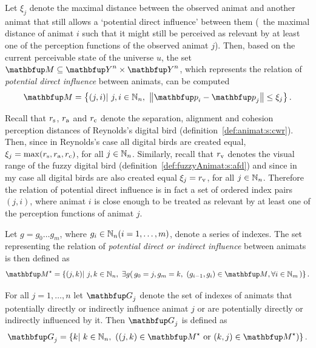 Let $\xi_j$ denote the maximal distance between the observed animat and another animat that still allows a `potential direct influence' between them (\ie\ the maximal distance of animat $i$ such that it might still be perceived as relevant by at least one of the perception functions of the observed animat $j$). Then, based on the current perceivable state of the universe $u$, the set $\set{M} \subseteq \set{Y}^n \times \set{Y}^n$, which represents the relation of \emph{potential direct influence} between animats, can be computed
%
\begin{equation}
\set{M}=\left\{ (j,i)|\ j, i \in \N_n,\ \left\|\vect{p}_i-\vect{p}_j\right\| \leq \xi_j \right\}. \label{eq:metric:M}
\end{equation}

Recall that $r_\textnormal{s}$, $r_\textnormal{a}$ and $r_\textnormal{c}$ denote the separation, alignment and cohesion perception distances of Reynolds's digital bird (definition~\ref{def:animat:s:cwr}). Then, since in Reynolds's case all digital birds are created equal, $\xi_j=\max(r_\textnormal{s},r_\textnormal{a},r_\textnormal{c})$, for all $j \in \mathbb{N}_n$. Similarly, recall that $r_\textnormal{v}$ denotes the visual range of the fuzzy digital bird (definition~\ref{def:fuzzyAnimat:s:afd}) and since in my case all digital birds are also created equal $\xi_j=r_\textnormal{v}$, for all $j \in \mathbb{N}_n$. Therefore the relation of potential direct influence is in fact a set of ordered index pairs $(j,i)$, where animat $i$ is close enough to be treated as relevant by at least one of the perception functions of animat $j$. 

Let $g=g_0\ldots g_m$, where $g_i \in \mathbb{N}_n (i=1,\ldots,m)$, denote a series of indexes. The set representing the relation of \emph{potential direct or indirect influence} between animats is then defined as
\begin{equation}
\set{M}^\star= \left\{ (j,k)|\ j, k \in \N_n,\ \exists g \right(g_0=j, g_m=k,\ (g_{i-1}, g_i) \in \set{M}, \forall i \in \N_m\left) \right\}. \label{eq:metric:M*}
\end{equation}

For all $j=1,\ldots,n$ let $\set{G}_j$ denote the set of indexes of animats that potentially directly or indirectly influence animat $j$ or are potentially directly or indirectly influenced by it. Then $\set{G}_j$ is defined as
\begin{equation}
\set{G}_j=\left\{k|\ k \in \N_n,\ \left((j,k) \in \set{M}^\star\ \mathrm{or}\ (k,j) \in \set{M}^\star\right) \right\}. \label{eq:metric:Gi}
\end{equation}


